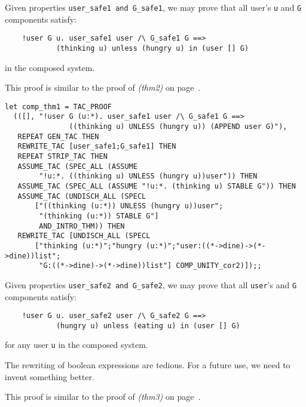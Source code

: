 \medskip
Given properties {\tt user\_safe1 and G\_safe1}, we may prove that all
user's {\tt u} and {\tt G} components satisfy:

{\footnotesize 
\begin{verbatim}
	!user G u. user_safe1 user /\ G_safe1 G ==>
            (thinking u) unless (hungry u) in (user [] G)
\end{verbatim}
}
in the composed system.

\smallskip
This proof is similar to the proof of {\it (thm2)} on page~\pageref{thm2page}.

{\footnotesize 
\begin{verbatim}
let comp_thm1 = TAC_PROOF
  (([], "!user G (u:*). user_safe1 user /\ G_safe1 G ==>
               ((thinking u) UNLESS (hungry u)) (APPEND user G)"),
   REPEAT GEN_TAC THEN
   REWRITE_TAC [user_safe1;G_safe1] THEN
   REPEAT STRIP_TAC THEN
   ASSUME_TAC (SPEC_ALL (ASSUME
        "!u:*. ((thinking u) UNLESS (hungry u))user")) THEN
   ASSUME_TAC (SPEC_ALL (ASSUME "!u:*. (thinking u) STABLE G")) THEN
   ASSUME_TAC (UNDISCH_ALL (SPECL
       ["((thinking (u:*)) UNLESS (hungry u))user";
        "(thinking (u:*)) STABLE G"]
        AND_INTRO_THM)) THEN
   REWRITE_TAC [UNDISCH_ALL (SPECL
       ["thinking (u:*)";"hungry (u:*)";"user:((*->dine)->(*->dine))list";
        "G:((*->dine)->(*->dine))list"] COMP_UNITY_cor2)]);;
\end{verbatim}
}

\medskip
Given properties {\tt user\_safe2 and G\_safe2}, we may prove that all
{\tt user}'s and {\tt G} components satisfy:

{\footnotesize 
\begin{verbatim}
	!user G u. user_safe2 user /\ G_safe2 G ==>
            (hungry u) unless (eating u) in (user [] G)
\end{verbatim}
}
for any user {\tt u} in the composed system.

\medskip
The rewriting of boolean expressions are tedious.  For a future use, we need 
to invent something better.

\smallskip
This proof is similar to the proof of {\it (thm3)} on page~\pageref{thm3page}.

